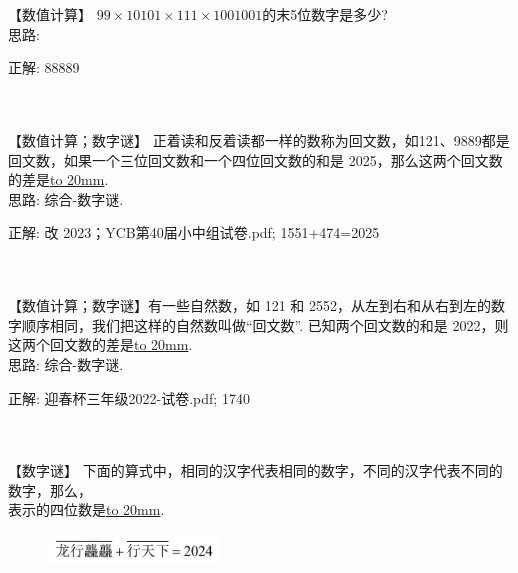 \item {
    【数值计算】
    $99\times 10101\times 111\times 1001001$的末5位数字是多少?
    \ifshowSolution
        \fangsong{}
        \\
        思路:

        正解: 88889
    \else
        \\ \\ \\
    \fi
}

\item {
    【数值计算；数字谜】
    正着读和反着读都一样的数称为回文数，如121、9889都是回文数，如果一个三位回文数和一个四位回文数的和是 2025，那么这两个回文数的差是\underline{\hbox to 20mm{}}.
    \ifshowSolution
        \fangsong{}
        \\
        思路: 综合-数字谜.

        正解: 改  2023；YCB第40届小中组试卷.pdf; 1551+474=2025
    \else
        \\ \\ \\
    \fi
}

\item {
    【数值计算；数字谜】有一些自然数，如 121 和 2552，从左到右和从右到左的数字顺序相同，我们把这样的自然数叫做``回文数''. 已知两个回文数的和是 2022，则这两个回文数的差是\underline{\hbox to 20mm{}}.
    \ifshowSolution
        \fangsong{}
        \\
        思路: 综合-数字谜.

        正解:  迎春杯三年级2022-试卷.pdf; 1740
    \else
        \\ \\ \\
    \fi
}


\item {
    【数字谜】
    下面的算式中，相同的汉字代表相同的数字，不同的汉字代表不同的数字，那么，\\   表示的四位数是\underline{\hbox to 20mm{}}.
    \begin{figure}[H] 
        \centering
        \includegraphics[width=0.4\textwidth]{./pics/Chapter_7/2.png}
    \end{figure}
    \vspace{1cm}
}

